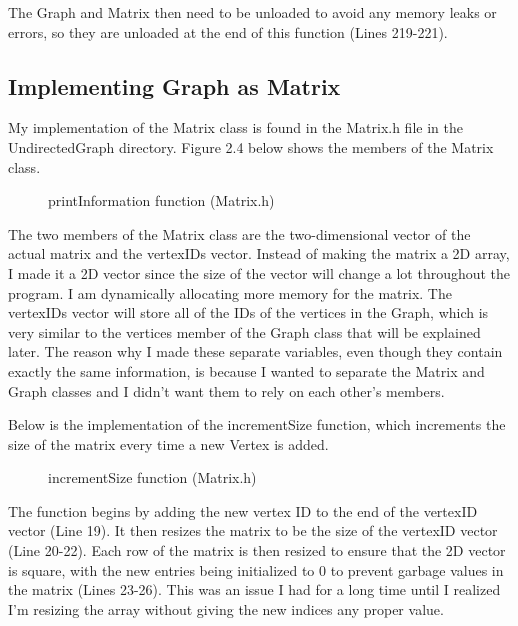 \documentclass[letterpaper, 10pt]{article}
\begin{document}
\vspace{1em}
\noindent
The Graph and Matrix then need to be unloaded to avoid any memory leaks or errors, so they are unloaded at the end of this function (Lines 219-221).

\subsection{Implementing Graph as Matrix}
\noindent
My implementation of the Matrix class is found in the Matrix.h file in the UndirectedGraph directory. Figure 2.4 below shows the members of the Matrix class.

\begin{figure}[H]
  \centering
   
  \caption{printInformation function (Matrix.h)}
  \label{fig:figure2.4}
\end{figure}

\noindent
The two members of the Matrix class are the two-dimensional vector of the actual matrix and the vertexIDs vector. Instead of making the matrix a 2D array, I made it a 2D vector since the size of the vector will change a lot throughout the program. I am dynamically allocating more memory for the matrix. The vertexIDs vector will store all of the IDs of the vertices in the Graph, which is very similar to the vertices member of the Graph class that will be explained later. The reason why I made these separate variables, even though they contain exactly the same information, is because I wanted to separate the Matrix and Graph classes and I didn't want them to rely on each other's members.

\vspace{1em}
\noindent
Below is the implementation of the incrementSize function, which increments the size of the matrix every time a new Vertex is added.

\begin{figure}[H]
  \centering
   
  \caption{incrementSize function (Matrix.h)}
  \label{fig:figure2.5}
\end{figure}

\noindent
The function begins by adding the new vertex ID to the end of the vertexID vector (Line 19). It then resizes the matrix to be the size of the vertexID vector (Line 20-22). Each row of the matrix is then resized to ensure that the 2D vector is square, with the new entries being initialized to 0 to prevent garbage values in the matrix (Lines 23-26). This was an issue I had for a long time until I realized I'm resizing the array without giving the new indices any proper value. 
\end{document}

